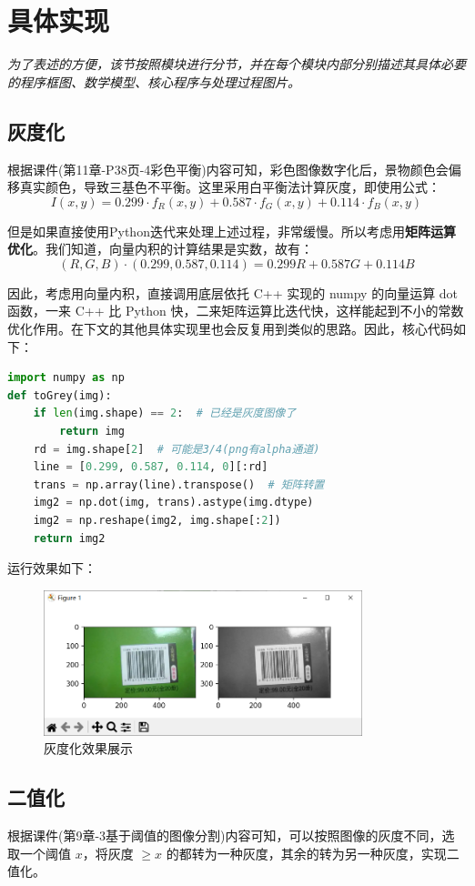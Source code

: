 \documentclass{ctexart}
\begin{document}
\section{具体实现}
\textit{为了表述的方便，该节按照模块进行分节，并在每个模块内部分别描述其具体必要的程序框图、数学模型、核心程序与处理过程图片。}
\subsection{灰度化}
根据课件(第11章-P38页-4彩色平衡)内容可知，彩色图像数字化后，景物颜色会偏移真实颜色，导致三基色不平衡。这里采用白平衡法计算灰度，即使用公式：%
\[I(x,y)=0.299\cdot f_R(x,y)+0.587\cdot f_G(x,y)+0.114\cdot f_B(x,y)\] %

但是如果直接使用Python迭代来处理上述过程，非常缓慢。所以考虑用\textbf{矩阵运算优化}。我们知道，向量内积的计算结果是实数，故有：
\[(R,G,B)\cdot(0.299,0.587,0.114)=0.299R+0.587G+0.114B\]

因此，考虑用向量内积，直接调用底层依托 C++ 实现的 numpy 的向量运算 dot 函数，一来 C++ 比 Python 快，二来矩阵运算比迭代快，这样能起到不小的常数优化作用。在下文的其他具体实现里也会反复用到类似的思路。因此，核心代码如下：
\begin{lstlisting}[language=python]
import numpy as np
def toGrey(img):
    if len(img.shape) == 2:  # 已经是灰度图像了
        return img
    rd = img.shape[2]  # 可能是3/4(png有alpha通道)
    line = [0.299, 0.587, 0.114, 0][:rd]
    trans = np.array(line).transpose()  # 矩阵转置
    img2 = np.dot(img, trans).astype(img.dtype)
    img2 = np.reshape(img2, img.shape[:2])
    return img2
\end{lstlisting}
运行效果如下：
\begin{figure}[htbp]
    \centering
    \includegraphics[height=120pt]{sample_toGrey}
    \caption{灰度化效果展示}
\end{figure}


\subsection{二值化}
根据课件(第9章-3基于阈值的图像分割)内容可知，可以按照图像的灰度不同，选取一个阈值 $x$，将灰度 $\ge x$ 的都转为一种灰度，其余的转为另一种灰度，实现二值化。
\end{document}
